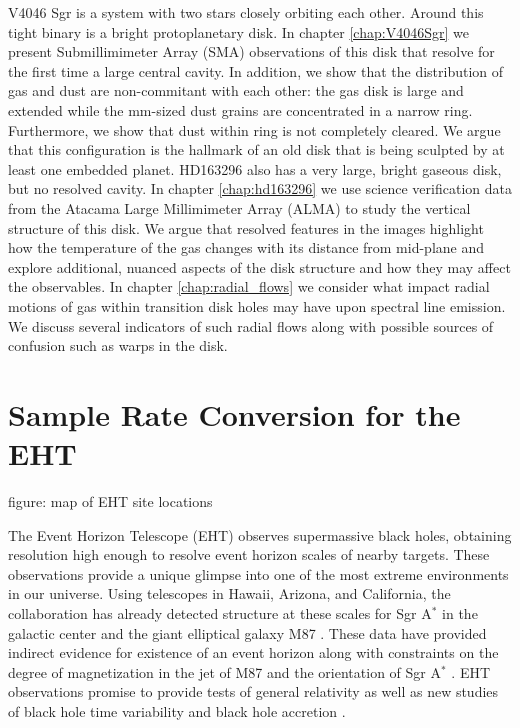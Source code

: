V4046 Sgr is a system with two stars closely orbiting each other.  Around this tight binary is a bright
protoplanetary disk.  In chapter \ref{chap:V4046Sgr} we present Submillimimeter Array (SMA) observations of this 
disk 
that resolve for the
first time a large central cavity.  In addition, we show that the distribution of gas and dust are non-commitant 
with each other: the gas disk is large and extended while the mm-sized dust grains are concentrated in a narrow 
ring.  Furthermore, we show that dust within ring is not completely cleared.  We argue that this configuration is 
the hallmark of an old disk that is being sculpted by at least one embedded planet.  HD163296 also has a 
very large, bright gaseous disk, but no resolved cavity.  In chapter \ref{chap:hd163296} we 
use 
science verification data from the Atacama Large Millimimeter Array (ALMA) to study the vertical structure of 
this disk.  We argue that resolved features in the images highlight how the temperature of the gas changes with
its distance from mid-plane and explore additional, nuanced aspects of the disk structure and how they may 
affect the observables.   In chapter \ref{chap:radial_flows} we consider what impact radial motions of gas within transition disk 
holes may have upon spectral line emission.  We discuss several indicators of such radial flows along 
with possible sources of confusion such as warps in the disk.

\section{Sample Rate Conversion for the EHT}

figure: map of EHT site locations

The Event Horizon Telescope (EHT) observes supermassive black holes, obtaining resolution high enough
to resolve event horizon scales of nearby targets.  These observations provide a 
unique glimpse into one of the most extreme environments in our universe.  Using telescopes in Hawaii, Arizona, 
and California, the collaboration has already detected structure at these scales for Sgr A$^\ast$ in the galactic 
center and the giant elliptical galaxy M87 \citep{doeleman08,doeleman09}.  These data have provided indirect 
evidence for existence of an event horizon \citep{broderick15} along with constraints on the degree of 
magnetization in the jet of M87 \citep{kino15} and the orientation of Sgr A$^\ast$ \citep{broderick11}.  EHT 
observations promise to provide tests of general relativity \citep{luminet79,johannsen10,bambi13,broderick14} as 
well as new studies of black hole time variability \citep{doeleman09} and black hole accretion \citep{chan15}.

